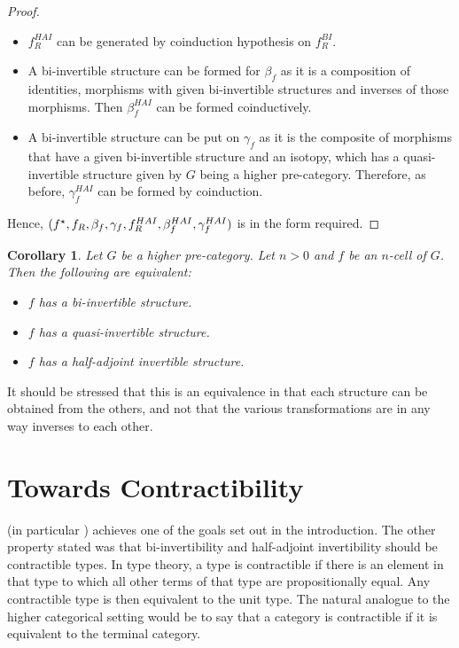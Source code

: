 \documentclass{article}
\newtheorem{cor}[theorem]{Corollary}
\begin{document}
\begin{proof}
\begin{itemize}
\begin{center}
    \end{center}
  \item \(f_R^{HAI}\) can be generated by coinduction hypothesis on
    \(f_R^{BI}\).
  \item A bi-invertible structure can be formed for \(\beta_f\) as it
    is a composition of identities, morphisms with given bi-invertible
    structures and inverses of those morphisms. Then \(\beta_f^{HAI}\)
    can be formed coinductively.
  \item A bi-invertible structure can be put on \(\gamma_f\) as it is
    the composite of morphisms that have a given bi-invertible
    structure and an isotopy, which has a quasi-invertible structure
    given by \(G\) being a higher pre-category. Therefore, as before,
    \(\gamma_f^{HAI}\) can be formed by coinduction.
  \end{itemize}
  Hence, \((f^\star, f_R, \beta_f, \gamma_f, f_R^{HAI},
  \beta_f^{HAI}, \gamma_f^{HAI})\) is in the form required.
\end{proof}

\begin{cor}\label{cor:equiv}
  Let \(G\) be a higher pre-category. Let \(n > 0\) and \(f\) be an
  \(n\)-cell of \(G\). Then the following are equivalent:
  \begin{itemize}
  \item \(f\) has a bi-invertible structure.
  \item \(f\) has a quasi-invertible structure.
  \item \(f\) has a half-adjoint invertible structure.
  \end{itemize}
\end{cor}
It should be stressed that this is an equivalence in that each
structure can be obtained from the others, and not that the various
transformations are in any way inverses to each other.

\section{Towards Contractibility}\label{sec:contractibility}

 (in particular ) achieves one of the
goals set out in the introduction. The other property stated was that
bi-invertibility and half-adjoint invertibility should be contractible
types. In type theory, a type is contractible if there is an element
in that type to which all other terms of that type are propositionally
equal. Any contractible type is then equivalent to the unit type.
The natural analogue to the higher categorical setting would be to say
that a category is contractible if it is equivalent to the terminal
category.
\end{document}
